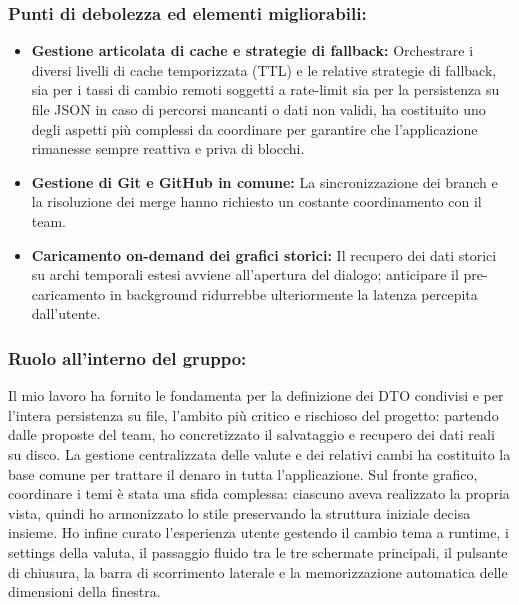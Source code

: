 \documentclass[11pt,a4paper,openright]{report}
\begin{document}
\subsubsection*{Punti di debolezza ed elementi migliorabili:}
\begin{itemize}
  \item \textbf{Gestione articolata di cache e strategie di fallback:} Orchestrare i diversi livelli di cache temporizzata (TTL) e le relative strategie di fallback, sia per i tassi di cambio remoti soggetti a rate-limit sia per la persistenza su file JSON in caso di percorsi mancanti o dati non validi, ha costituito uno degli aspetti più complessi da coordinare per garantire che l'applicazione rimanesse sempre reattiva e priva di blocchi.
  \item \textbf{Gestione di Git e GitHub in comune:} La sincronizzazione dei branch e la risoluzione dei merge hanno richiesto un costante coordinamento con il team.
  \item \textbf{Caricamento on-demand dei grafici storici:} Il recupero dei dati storici su archi temporali estesi avviene all'apertura del dialogo; anticipare il pre-caricamento in background ridurrebbe ulteriormente la latenza percepita dall'utente.
\end{itemize}

\subsubsection*{Ruolo all'interno del gruppo:}
Il mio lavoro ha fornito le fondamenta per la definizione dei DTO condivisi e per l'intera persistenza su file, l'ambito più critico e rischioso del progetto: partendo dalle proposte del team, ho concretizzato il salvataggio e recupero dei dati reali su disco. La gestione centralizzata delle valute e dei relativi cambi ha costituito la base comune per trattare il denaro in tutta l'applicazione. Sul fronte grafico, coordinare i temi è stata una sfida complessa: ciascuno aveva realizzato la propria vista, quindi ho armonizzato lo stile preservando la struttura iniziale decisa insieme. Ho infine curato l'esperienza utente gestendo il cambio tema a runtime, i settings della valuta, il passaggio fluido tra le tre schermate principali, il pulsante di chiusura, la barra di scorrimento laterale e la memorizzazione automatica delle dimensioni della finestra.
\end{document}

